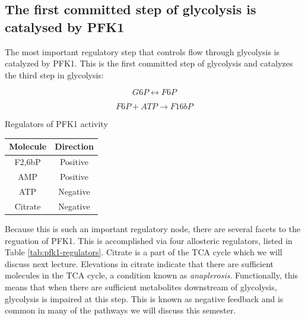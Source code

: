 \documentclass{tufte-handout}
\begin{document}
\subsection{The first committed step of glycolysis is catalysed by PFK1}

The most important regulatory step that controls flow through glycolysis is catalyzed by PFK1.  This is the first committed step of glycolysis and catalyzes the third step in glycolysis:

\begin{equation}\label{eq:pgm}
G6P \leftrightarrow F6P
\end{equation}

\begin{equation}\label{eq:pfk1}
F6P + ATP \rightarrow F16bP
\end{equation}

\begin{margintable}
\centering
\caption{Regulators of PFK1 activity}
\label{tab:pfk1-regulators}
\begin{tabular}{cc}
\hline
\textbf {Molecule} & \textbf{Direction}  \\
\hline
F2,6bP & Positive \\
AMP & Positive \\
ATP & Negative \\
Citrate & Negative \\
\hline
\end{tabular}
\end{margintable}

Because this is such an important regulatory node, there are several facets to the reguation of PFK1.  This is accomplished via four allosteric regulators, listed in Table \ref{tab:pfk1-regulators}.  Citrate is a part of the TCA cycle which we will discuss next lecture.  Elevations in citrate indicate that there are sufficient molecules in the TCA cycle, a condition known as \emph{anaplerosis}.  Functionally, this means that when there are sufficient metabolites downstream of glycolysis, glycolysis is impaired at this step.  This is known as negative feedback and is common in many of the pathways we will discuss this semester.
\end{document}
